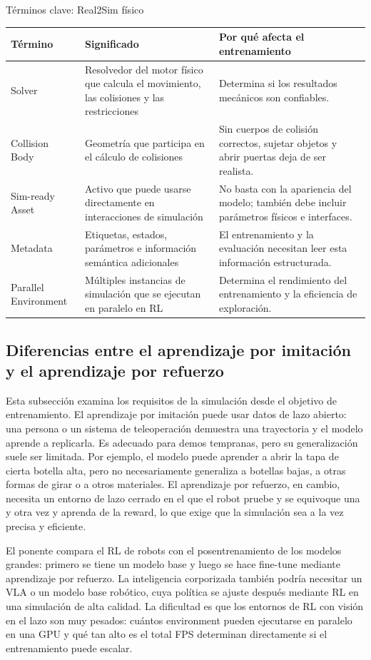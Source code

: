 \begin{knowledgebox}{Términos clave: Real2Sim físico}
\begin{tabularx}{\textwidth}{p{}p{}X}
\toprule
Término & Significado & Por qué afecta el entrenamiento \\
\midrule
Solver & Resolvedor del motor físico que calcula el movimiento, las colisiones y las restricciones & Determina si los resultados mecánicos son confiables. \\
Collision Body & Geometría que participa en el cálculo de colisiones & Sin cuerpos de colisión correctos, sujetar objetos y abrir puertas deja de ser realista. \\
Sim-ready Asset & Activo que puede usarse directamente en interacciones de simulación & No basta con la apariencia del modelo; también debe incluir parámetros físicos e interfaces. \\
Metadata & Etiquetas, estados, parámetros e información semántica adicionales & El entrenamiento y la evaluación necesitan leer esta información estructurada. \\
Parallel Environment & Múltiples instancias de simulación que se ejecutan en paralelo en RL & Determina el rendimiento del entrenamiento y la eficiencia de exploración. \\
\bottomrule
\end{tabularx}
\end{knowledgebox}

\subsection{Diferencias entre el aprendizaje por imitación y el aprendizaje por refuerzo}

Esta subsección examina los requisitos de la simulación desde el objetivo de entrenamiento. El aprendizaje por imitación puede usar datos de lazo abierto: una persona o un sistema de teleoperación demuestra una trayectoria y el modelo aprende a replicarla. Es adecuado para demos tempranas, pero su generalización suele ser limitada. Por ejemplo, el modelo puede aprender a abrir la tapa de cierta botella alta, pero no necesariamente generaliza a botellas bajas, a otras formas de girar o a otros materiales. El aprendizaje por refuerzo, en cambio, necesita un entorno de lazo cerrado en el que el robot pruebe y se equivoque una y otra vez y aprenda de la reward, lo que exige que la simulación sea a la vez precisa y eficiente.

El ponente compara el RL de robots con el posentrenamiento de los modelos grandes: primero se tiene un modelo base y luego se hace fine-tune mediante aprendizaje por refuerzo. La inteligencia corporizada también podría necesitar un VLA o un modelo base robótico, cuya política se ajuste después mediante RL en una simulación de alta calidad. La dificultad es que los entornos de RL con visión en el lazo son muy pesados: cuántos environment pueden ejecutarse en paralelo en una GPU y qué tan alto es el total FPS determinan directamente si el entrenamiento puede escalar.

